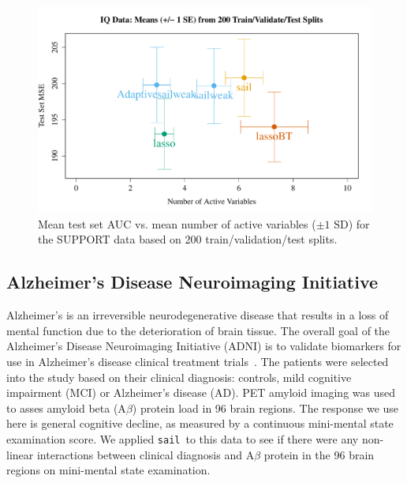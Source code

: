 \documentclass[12pt,letter]{article}\usepackage[]{graphicx}\usepackage[]{color}
\newenvironment{knitrout}{}{} %
\newcommand{\sail}{\texttt{sail}}
\begin{document}
\begin{knitrout}\scriptsize
{}\color{fgcolor}\begin{figure}[H]

{\centering \includegraphics[width=1\linewidth]{figure/PRS-error-crosses-plots-1} 

}

\caption[Mean test set AUC vs]{Mean test set AUC vs. mean number of active variables ($\pm 1$ SD) for the SUPPORT data based on 200 train/validation/test splits.}\label{fig:PRS-error-crosses-plots}
\end{figure}


\end{knitrout}




\subsection{Alzheimer's Disease Neuroimaging Initiative}

Alzheimer's is an irreversible neurodegenerative disease that results in a loss of mental function due to the deterioration of brain tissue. The overall goal of the Alzheimer's Disease Neuroimaging Initiative (ADNI) is to validate biomarkers for use in
Alzheimer's disease clinical treatment trials~\citep{petersen2010alzheimer}. The patients were selected into the study based on their clinical diagnosis: controls, mild cognitive impairment (MCI) or Alzheimer's disease (AD). PET amyloid imaging was used to asses amyloid beta (A$\beta$) protein load in 96 brain regions. The response we use here is general cognitive decline, as measured by a continuous mini-mental state examination score. We applied \sail ~to this data to see if there were any non-linear interactions between clinical diagnosis and A$\beta$ protein in the 96 brain regions on mini-mental state examination.
\end{document}

